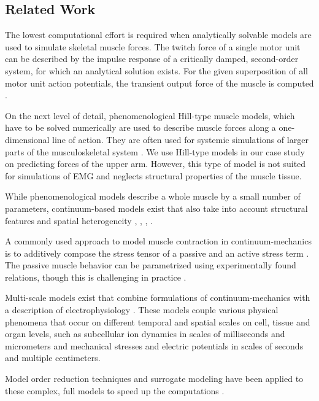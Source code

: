 \subsection{Related Work}
The lowest computational effort is required when analytically solvable models are used to simulate skeletal muscle forces. The twitch force of a single motor unit can be described by the impulse response of a critically damped, second-order system, for which an analytical solution exists. For the given superposition of all motor unit action potentials, the transient output force of the muscle is computed  \cite{Cisi2008,Dideriksen2010}.

On the next level of detail, phenomenological Hill-type muscle models, which have to be solved numerically are used to describe muscle forces along a one-dimensional line of action. They are often used for systemic simulations of larger parts of the musculoskeletal system \cite{Zajac1989,OpenSim2007,Hilltype2014,Bayer2017}. We use Hill-type models in our case study on predicting forces of the upper arm. However, this type of model is not suited for simulations of EMG and neglects structural properties of the muscle tissue.

While phenomenological models describe a whole muscle by a small number of parameters, continuum-based models exist that also take into account structural features and spatial heterogeneity \cite{Johansson2000}, \cite{Blemker2005a}, \cite{Roehrle2007}, \cite{Boel2008}.

A commonly used approach to model muscle contraction in continuum-mechanics is to additively compose the stress tensor of a passive and an active stress term \cite{blemker2005three,Johansson2000,Roehrle2008}. The passive muscle behavior can be parametrized using experimentally found relations, though this is challenging in practice \cite{Boel2012,Takaza2013,VanLoocke2008,VanLoocke2006}.

Multi-scale models exist that combine formulations of continuum-mechanics with a description of electrophysiology \cite{Roehrle2008,Roehrle2012,Heidlauf2013,HernandezGascon2013}.
These models couple various physical phenomena that occur on different temporal and spatial scales on cell, tissue and organ levels, such as subcellular ion dynamics in scales of milliseconds and micrometers and mechanical stresses and electric potentials in scales of seconds and multiple centimeters.%

Model order reduction techniques and surrogate modeling have been applied to these complex, full models to speed up the computations \cite{Mordhorst2017,Valentin2018}.


